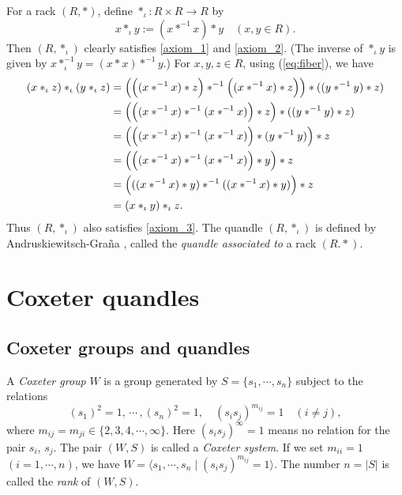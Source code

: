 \documentclass{amsart}
\theoremstyle{definition}
\theoremstyle{remark}
\numberwithin{equation}{section}
\begin{document}
For a rack $(R, *)$, 
define $*_{\iota} : R \times R \to R$ by
\begin{equation}
\label{eq:associated_quandle}
x *_{\iota} y := ( x *^{-1} x) * y \quad (x,y \in R).
\end{equation}
Then $(R, *_{\iota})$ clearly satisfies \ref{axiom_1} and \ref{axiom_2}.
(The inverse of $*_{\iota}y$ is given by $x *_{\iota}^{-1} y = (x*x)*^{-1} y$.)
For $x, y, z \in R$, using (\ref{eq:fiber}), we have
\[
\begin{split}
(x *_{\iota} z) *_{\iota} (y *_{\iota} z)
&= \Bigl( \Bigl( ( x *^{-1} x) * z \Bigr) *^{-1} \Bigl( ( x *^{-1} x) * z \Bigr) \Bigr) * ((y*^{-1}y)*z) \\
&= \Bigl( \Bigl( ( x *^{-1} x) *^{-1} ( x *^{-1} x) \Bigr) * z \Bigr) * ((y*^{-1}y)*z) \\
&= \Bigl( \Bigl( ( x *^{-1} x) *^{-1} ( x *^{-1} x) \Bigr) * (y*^{-1}y) \Bigr)  * z\\
&= \Bigl( \Bigl( ( x *^{-1} x) *^{-1} ( x *^{-1} x) \Bigr) * y \Bigr)  * z\\
&= \Bigl( (( x *^{-1} x) * y) *^{-1} (( x *^{-1} x)*y) \Bigr) * z \\
&= (x *_{\iota} y) *_{\iota} z.
\end{split}
\]
Thus $(R, *_{\iota})$ also satisfies \ref{axiom_3}. 
The quandle $(R, *_{\iota})$ is defined by 
Andruskiewitsch-Gra\~{n}a \cite[\S 1.1.1]{AG}, 
called the \emph{quandle associated to} a rack $(R.*)$.

\section{Coxeter quandles}
\label{sec:coxeter_quandles}
\subsection{Coxeter groups and quandles}
\label{subsec:coxeter_groups_and_quandles}
A \emph{Coxeter group} $W$ is a group generated by $S = \{s_1, \cdots , s_n\}$ subject to 
the relations
\[
(s_1)^2 = 1, \, \cdots \, , (s_n)^2 = 1, \quad
(s_is_j)^{m_{i j}} = 1 \quad (i \neq j), 
\]
where $m_{i j} = m_{j i} \in \{2, 3, 4, \cdots , \infty \}$. 
Here $(s_is_j)^{\infty} = 1 $ means no relation for the pair $s_i$, $s_j$.
The pair $(W, S)$ is called a \emph{Coxeter system}.
If we set $m_{ii} = 1$ $(i = 1, \cdots , n)$, 
we have $W = \langle s_1, \cdots , s_n \mid (s_i s_j)^{m_{i j}} = 1 \rangle$.
The number $n = |S|$ is called the \emph{rank} of $(W, S)$.
\end{document}

